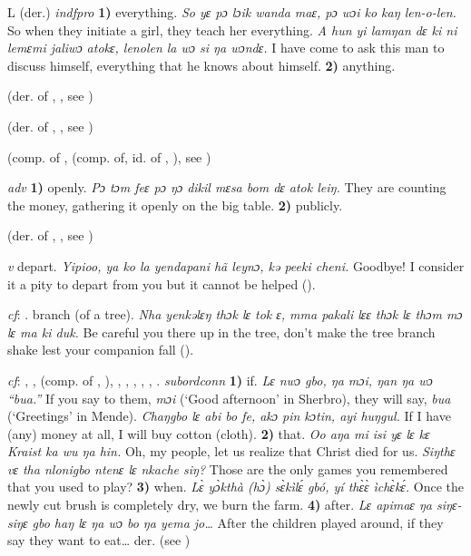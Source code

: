 \begin{letter}{L}
 (der.) \textit{indfpro} \textbf{1)} everything. \textit{So yɛ pɔ lɔik wanda maɛ, pɔ wɔi ko kaŋ len-o-len.} So when they initiate a girl, they teach her everything. \textit{A hun yi lamŋan dɛ ki ni lemɛmi jaliwɔ atokɛ, lenolen la wɔ si ŋa wɔndɛ.} I have come to ask this man to discuss himself, everything that he knows about himself. \textbf{2)} anything.

 (der. of , , see ) 

 (der. of , , see ) 

 (comp. of ,  (comp. of, id. of , ), see ) 

 \textit{adv} \textbf{1)} openly. \textit{Pɔ tɔm feɛ pɔ ŋɔ dikil mɛsa bom dɛ atok leiŋ.} They are counting the money, gathering it openly on the big table. \textbf{2)} publicly.

 (der. of , , see ) 

 \textit{v} depart. \textit{Yipioo, ya ko la yendapani hã leynɔ, kə peeki cheni.} Goodbye! I consider it a pity to depart from you but it cannot be helped (\citealt{Pichl1967}). 

 \textit{cf}: . branch (of a tree). \textit{Nha yenkəlɛŋ thɔk lɛ tok ɛ, mma pakali lɛɛ thɔk lɛ thɔm mɔ lɛ ma ki duk.} Be careful you there up in the tree, don't make the tree branch shake lest your companion fall (\citealt{Pichl1967}). 

 \textit{cf}: , ,  (comp. of , ), , , , , , . \textit{subordconn} \textbf{1)} if. \textit{Lɛ nwɔ gbo, ŋa mɔi, ŋan ŋa wɔ “bua.”} If you say to them, \textit{mɔi} (‘Good afternoon' in Sherbro), they will say, \textit{bua} (‘Greetings' in Mende). \textit{Chaŋgbo lɛ abi bo fe, akɔ pin kɔtin, ayi huŋgul.} If I have (any) money at all, I will buy cotton (cloth). \textbf{2)} that. \textit{Oo aŋa mi isi yɛ lɛ kɛ Kraist ka wu ŋa hin.} Oh, my people, let us realize that Christ died for us. \textit{Siŋthɛ vɛ tha nlonigbo ntenɛ lɛ nkache siŋ?} Those are the only games you remembered that you used to play? \textbf{3)} when. \textit{Lɛ̀ yɔ̀kthà (hɔ̀) sɛ̀kìlɛ́ gbó, yí thɛ̀ɛ̀ ìchɛ̀kɛ́.} Once the newly cut brush is completely dry, we burn the farm. \textbf{4)} after. \textit{Lɛ apimaɛ ŋa siŋɛ-siŋɛ gbo haŋ lɛ ŋa wɔ bo ŋa yema jo…} After the children played around, if they say they want to eat… der.  (see ) 


\end{letter}
